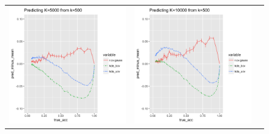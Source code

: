 \documentclass[twoside,11pt]{article}
\begin{document}
\begin{figure}
\begin{tabular}{ccc}
\includegraphics[scale = 0.45, clip = true, trim = .3in 0 1.23in 0.4in]{sim_large7_biaz_K5_k0_5.png} &
\includegraphics[scale = 0.45, clip = true, trim = .3in 0 0.00in 0.4in]{sim_large7_biaz_K10_k0_5.png}\\ 

\end{tabular}
\end{figure}
\end{document}
